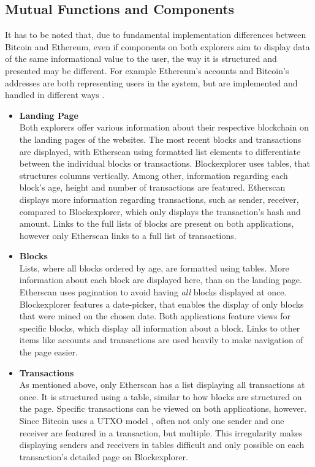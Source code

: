 \subsection{Mutual Functions and Components}
It has to be noted that, due to fundamental implementation differences between Bitcoin and Ethereum, even if components on both explorers aim to display data of the same informational value to the user, the way it is structured and presented may be different. For example Ethereum's accounts and Bitcoin's addresses are both representing users in the system, but are implemented and handled in different ways \cite{ethereum} \cite{bitcoin}.
\begin{itemize}
\item \textbf{Landing Page}\\
Both explorers offer various information about their respective blockchain on the landing pages of the websites. The most recent blocks and transactions are displayed, with Etherscan using formatted list elements to differentiate between the individual blocks or transactions. Blockexplorer uses tables, that structures columns vertically. Among other, information regarding each block's age, height and number of transactions are featured. Etherscan displays more information regarding transactions, such as sender, receiver, compared to Blockexplorer, which only displays the transaction's hash and amount. Links to the full lists of blocks are present on both applications, however only Etherscan links to a full list of transactions.
\item \textbf{Blocks}\\
Lists, where all blocks ordered by age, are formatted using tables. More information about each block are displayed here, than on the landing page. Etherscan uses pagination to avoid having \emph{all} blocks displayed at once. Blockexplorer features a date-picker, that enables the display of only blocks that were mined on the chosen date. Both applications feature views for specific blocks, which display all information about a block. Links to other items like accounts and transactions are used heavily to make navigation of the page easier.
\item \textbf{Transactions}\\
As mentioned above, only Etherscan has a list displaying all transactions at once. It is structured using a table, similar to how blocks are structured on the page. Specific transactions can be viewed on both applications, however. Since Bitcoin uses a UTXO model \cite{bitcoin}, often not only one sender and one receiver are featured in a transaction, but multiple. This irregularity makes displaying senders and receivers in tables difficult and only possible on each transaction's detailed page on Blockexplorer.

\end{itemize}
